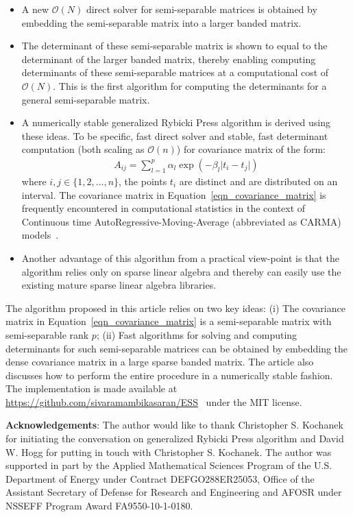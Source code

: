 \documentclass[final,leqno]{siamltex}
\begin{document}
\begin{itemize}
\item
A new $\mathcal{O}(N)$ direct solver for semi-separable matrices is obtained by embedding the semi-separable matrix into a larger banded matrix.
\item
The determinant of these semi-separable matrix is shown to equal to the determinant of the larger banded matrix, thereby enabling computing determinants of these semi-separable matrices at a computational cost of $\mathcal{O}(N)$. This is the first algorithm for computing the determinants for a general semi-separable matrix.
\item
A numerically stable generalized Rybicki Press algorithm is derived using these ideas. To be specific, fast direct solver and stable, fast determinant computation (both scaling as $\mathcal{O}(n)$) for covariance matrix of the form:
\begin{align}
A_{ij} = \sum_{l=1}^p \alpha_l \exp\left(-\beta_l \vert t_i - t_j \vert\right)
\label{eqn_covariance_matrix}
\end{align}
where $i,j \in \{1,2,\ldots,n\}$, the points $t_i$ are distinct and are distributed on an interval. The covariance matrix in Equation~\eqref{eqn_covariance_matrix} is frequently encountered in computational statistics in the context of Continuous time AutoRegressive-Moving-Average (abbreviated as CARMA) models~\cite{brockwell2002introduction, brockwell2001levy, brockwell1994continuous}.
\item
Another advantage of this algorithm from a practical view-point is that the algorithm relies only on sparse linear algebra and thereby can easily use the existing mature sparse linear algebra libraries.
\end{itemize}

The algorithm proposed in this article relies on two key ideas: (i) The covariance matrix in Equation~\eqref{eqn_covariance_matrix} is a semi-separable matrix with semi-separable rank $p$; (ii) Fast algorithms for solving and computing determinants for such semi-separable matrices can be obtained by embedding the dense covariance matrix in a large sparse banded matrix. The article also discusses how to perform the entire procedure in a numerically stable fashion. The implementation is made available at \url{https://github.com/sivaramambikasaran/ESS}~\cite{ambikasaran2014ESS} under the MIT license.

\textbf{Acknowledgements}: The author would like to thank Christopher S. Kochanek for initiating the conversation on generalized Rybicki Press algorithm and David W. Hogg for putting in touch with Christopher S. Kochanek. The author was supported in part by the Applied Mathematical Sciences Program of the U.S. Department of Energy under Contract DEFGO288ER25053, Office of the Assistant Secretary of Defense for Research and Engineering and AFOSR under NSSEFF Program Award FA9550-10-1-0180.
\end{document}
